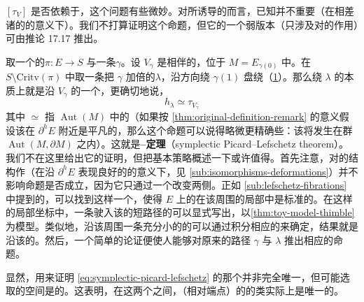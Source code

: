 \begin{remark}\label{thm:dehn-twist-framing-independence}
$[\tau_V]$ 是否依赖于\trFrame{}，这个问题有些微妙。对\trFukayaCategory{}所诱导的\trAutoequivalence{}而言，已知\trFrame{}并不重要（在相差诸\trAFunctor{}的\trIsomorphism{}的意义下）。我们不打算证明这个命题，但它的一个弱版本（只涉及对\trObject{}的作用）可由推论 17.17 推出。
\end{remark}
取一个\trExact{}的\trLefschetzFibration{}$\pi\colon E\to S$ 与一条\trVanishingPath{}$\gamma$。设 $V_\gamma$ 是相伴的\trVanishingCycle{}，位于 $M=E_{\gamma(0)}$ 中。在 $S\setminus\mathrm{Critv}(\pi)$ 中取一条把 $\gamma$ 加倍的\trLoop{}$\lambda$，沿\trAnticlockwise{}方向绕 $\gamma(1)$ 盘绕（\cref{fig:dehn-twist-monodromy}）。那么绕 $\lambda$ 的\trMonodromy{}本质上就是沿 $V_\gamma$ 的一个\trDehnTwist{}，更确切地说，
\begin{equation}\label{eq:symplectic-picard-lefschetz}
h_\lambda\simeq\tau_{V_\gamma}
\end{equation}
其中 $\simeq$ 指 $\operatorname{Aut}(M)$ 中的\trIsotopy{}（如果按 \cref{thm:original-definition-remark} 的意义假设该\trFibration{}在 $\partial^hE$ 附近是平凡的，那么这个命题可以说得略微更精确些：该\trIsotopy{}将发生在群 $\operatorname{Aut}(M,\partial M)$ 之内）。这就是\textbf{\trSymplectic\trPicard--\trLefschetz{}定理}（symplectic Picard--Lefschetz theorem）。我们不在这里给出它的证明，但把基本策略概述一下或许值得。首先注意，对\trLefschetzFibration{}的结构作\trDeformation{}（在沿 $\partial^hE$ 表现良好的\trDeformation{}的意义下，见 \cref{sub:isomorphisms-deformations}）并不影响命题是否成立，因为它只通过一个\trIsotopy{}改变两侧。正如 \cref{sub:lefschetz-fibrations} 中提到的，可以找到这样一个\trDeformation，使得 $E$ 上的\trSymplecticStructure{}在该\trCriticalPoint{}周围的局部\trHolomorphic\trMorse{}\trChart{}中是标准的。在这样的局部坐标中，一条驶入该\trCriticalPoint{}的短路径的\trVanishingCycle{}可以显式写出，以\cref{thm:toy-model-thimble}为模型。类似地，沿该\trCriticalPoint{}周围一条充分小的\trCircle{}的\trMonodromy{}可以通过积分相应的\trVectorField{}来确定，结果就是沿该\trVanishingCycle{}的\trDehnTwist{}。然后，一个简单的\trParallelTransport{}论证便使人能够对原来的路径 $\gamma$ 与 $\lambda$ 推出相应的命题。
\begin{figure}[htbp]
\centering
{}
\caption{}\label{fig:dehn-twist-monodromy}
\end{figure}
\begin{remark}\label{thm:picard-lefschetz-isotopy-uniqueness}
显然，用来证明 \eqref{eq:symplectic-picard-lefschetz} 的那个\trDeformation{}并非完全唯一，但可能选取的空间是\trContractible{}的。这表明，在这两个\trSymplectic\trAutomorphism{}之间，（相对端点）的\trIsotopy{}的\trHomotopy{}类实际上是唯一的。
\end{remark}

